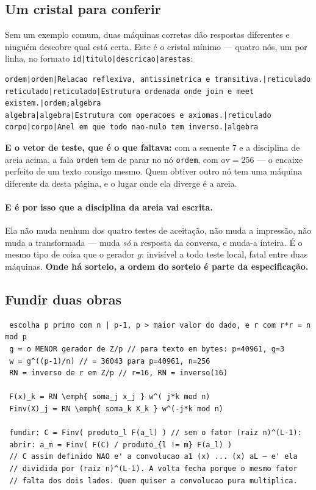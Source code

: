 \documentclass[11pt]{article}
\newcommand{\code}[1]{\texttt{\small #1}}
\theoremstyle{plain}
\theoremstyle{remark}
\begin{document}
\subsection{Um cristal para conferir}

Sem um exemplo comum, duas máquinas corretas dão respostas diferentes e ninguém
descobre qual está certa. Este é o cristal mínimo --- quatro nós, um por linha,
no formato \code{id|titulo|descricao|arestas}:

\begin{verbatim}
ordem|ordem|Relacao reflexiva, antissimetrica e transitiva.|reticulado
reticulado|reticulado|Estrutura ordenada onde join e meet existem.|ordem;algebra
algebra|algebra|Estrutura com operacoes e axiomas.|reticulado
corpo|corpo|Anel em que todo nao-nulo tem inverso.|algebra
\end{verbatim}

\noindent \textbf{E o vetor de teste, que é o que faltava:} com a semente $7$ e
a disciplina de areia acima, a fala \code{ordem} tem de parar no nó
\code{ordem}, com $\mathrm{ov}=256$ --- o encaixe perfeito de um texto consigo
mesmo. Quem obtiver outro nó tem uma máquina diferente da desta página, e o
lugar onde ela diverge é a areia.

\paragraph{E é por isso que a disciplina da areia vai escrita.} Ela não muda
nenhum dos quatro testes de aceitação, não muda a impressão, não muda a
transformada --- muda \emph{só} a resposta da conversa, e muda-a inteira. É o
mesmo tipo de coisa que o gerador $g$: invisível a todo teste local, fatal
entre duas máquinas. \textbf{Onde há sorteio, a ordem do sorteio é parte da
especificação.}

\subsection{Fundir duas obras}

\begin{verbatim}
 escolha p primo com n | p-1, p > maior valor do dado, e r com r*r = n mod p
 g = o MENOR gerador de Z/p // para texto em bytes: p=40961, g=3
 w = g^((p-1)/n) // = 36043 para p=40961, n=256
 RN = inverso de r em Z/p // r=16, RN = inverso(16)

 F(x)_k = RN \emph{ soma_j x_j } w^( j*k mod n)
 Finv(X)_j = RN \emph{ soma_k X_k } w^(-j*k mod n)

 fundir: C = Finv( produto_l F(a_l) ) // sem o fator (raiz n)^(L-1):
 abrir: a_m = Finv( F(C) / produto_{l != m} F(a_l) )
 // C assim definido NAO e' a convolucao a1 (x) ... (x) aL — e' ela
 // dividida por (raiz n)^(L-1). A volta fecha porque o mesmo fator
 // falta dos dois lados. Quem quiser a convolucao pura multiplica.
\end{verbatim}
\end{document}
